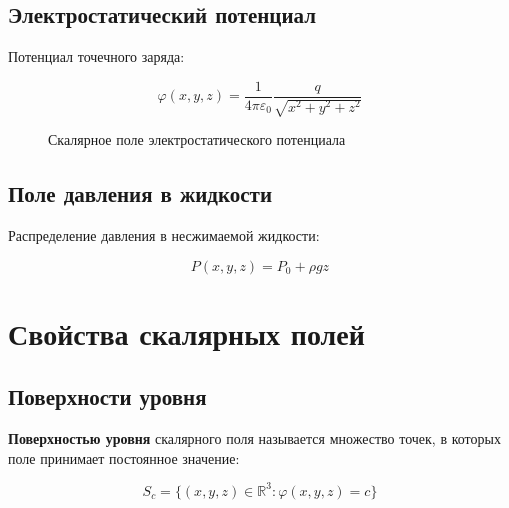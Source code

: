 \documentclass[12pt]{article}
\begin{document}
	\subsection{Электростатический потенциал}
	
	Потенциал точечного заряда:
	
	\[
	\varphi(x, y, z) = \frac{1}{4\pi\varepsilon_0} \frac{q}{\sqrt{x^2 + y^2 + z^2}}
	\]
	
	\begin{figure}[H]
		\centering
		\caption{Скалярное поле электростатического потенциала}
	\end{figure}
	
	\subsection{Поле давления в жидкости}
	
	Распределение давления в несжимаемой жидкости:
	
	\[
	P(x, y, z) = P_0 + \rho g z
	\]
	
	\section{Свойства скалярных полей}
	
	\subsection{Поверхности уровня}
	
	\textbf{Поверхностью уровня} скалярного поля называется множество точек, в которых поле принимает постоянное значение:
	
	\[
	S_c = \{(x, y, z) \in \mathbb{R}^3 : \varphi(x, y, z) = c\}
	\]
	
\end{document}
